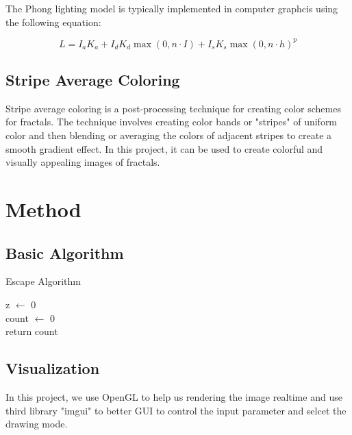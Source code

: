 \documentclass{article}
\begin{document}
        The Phong lighting model is typically implemented in computer graphcis using the following equation:

        \begin{equation}
            \label{equ:phong}
            L=I_aK_a+I_dK_d\max(0,n\cdot I) + I_sK_s\max(0, n\cdot h)^p
        \end{equation}

    \subsection{Stripe Average Coloring}
        Stripe average coloring is a post-processing technique for creating color schemes for fractals. The technique involves creating color bands or "stripes" of uniform color and then blending or averaging the colors of adjacent stripes to create a smooth gradient effect. In this project, it can be used to create colorful and visually appealing images of fractals.
    
\section{Method}

    \subsection{Basic Algorithm}
        \begin{algorithm}[H]  %
        	\caption{Escape Algorithm}%
        	\LinesNumbered %
        	z $\leftarrow$ 0\\
        	count $\leftarrow$ 0\\
        	return count
        \end{algorithm}
    
    \subsection{Visualization}
        In this project, we use OpenGL to help us rendering the image realtime and use third library "imgui" to 
        better GUI to control the input parameter and selcet the drawing mode.\\
\end{document}
